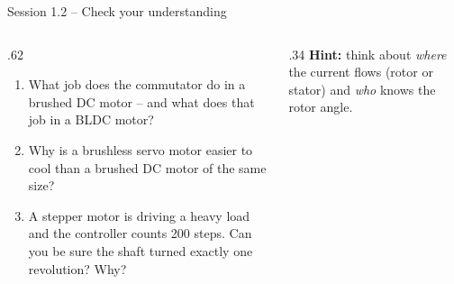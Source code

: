\documentclass[aspectratio=169,10pt]{beamer}
\begin{document}
\begin{frame}{Session 1.2 -- Check your understanding}
\begin{columns}[T]
\begin{column}{.62\textwidth}
\begin{keybox}
\begin{enumerate}\setlength\itemsep{6pt}
\item What job does the commutator do in a brushed DC motor -- and what does that job in a BLDC motor?
\item Why is a brushless servo motor easier to cool than a brushed DC motor of the same size?
\item A stepper motor is driving a heavy load and the controller counts 200 steps. Can you be sure the shaft turned exactly one revolution? Why?
\end{enumerate}
\end{keybox}
\end{column}
\begin{column}{.34\textwidth}
\small
\textbf{Hint:} think about \emph{where} the current flows (rotor or stator) and \emph{who} knows the rotor angle.
\end{column}
\end{columns}
\end{frame}
\end{document}

